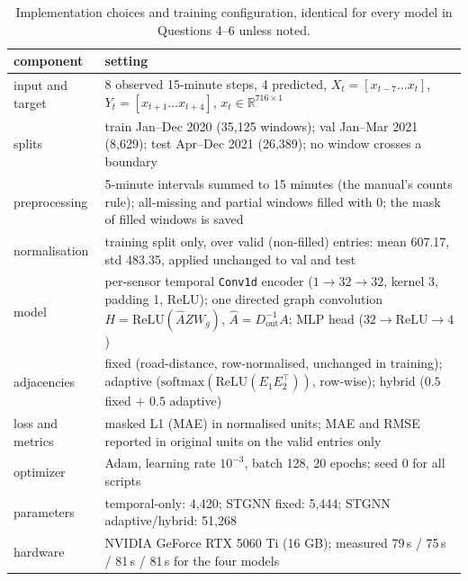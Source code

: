 \documentclass[11pt,letterpaper]{article}
\begin{document}
\begin{table}[htbp]
\centering
\small
\begin{tabular}{@{}p{1.2in}p{5.6in}@{}}
\toprule
\textbf{component} & \textbf{setting} \\
\midrule
input and target & 8 observed 15-minute steps, 4 predicted, $X_t = [x_{t-7} \dots x_t]$, $Y_t = [x_{t+1} \dots x_{t+4}]$, $x_t \in \mathbb{R}^{716 \times 1}$ \\
splits & train Jan--Dec 2020 (35{,}125 windows); val Jan--Mar 2021 (8{,}629); test Apr--Dec 2021 (26{,}389); no window crosses a boundary \\
preprocessing & 5-minute intervals summed to 15 minutes (the manual's counts rule); all-missing and partial windows filled with $0$; the mask of filled windows is saved \\
normalisation & training split only, over valid (non-filled) entries: mean 607.17, std 483.35, applied unchanged to val and test \\
model & per-sensor temporal \texttt{Conv1d} encoder ($1 \!\to\! 32 \!\to\! 32$, kernel 3, padding 1, ReLU); one directed graph convolution $H = \mathrm{ReLU}(\hat{A} Z W_g)$, $\hat{A} = D_{\mathrm{out}}^{-1} A$; MLP head ($32 \to \mathrm{ReLU} \to 4$) \\
adjacencies & fixed (road-distance, row-normalised, unchanged in training); adaptive ($\mathrm{softmax}(\mathrm{ReLU}(E_1 E_2^{\top}))$, row-wise); hybrid ($0.5$ fixed $+$ $0.5$ adaptive) \\
loss and metrics & masked L1 (MAE) in normalised units; MAE and RMSE reported in original units on the valid entries only \\
optimizer & Adam, learning rate $10^{-3}$, batch 128, 20 epochs; seed 0 for all scripts \\
parameters & temporal-only: 4{,}420; STGNN fixed: 5{,}444; STGNN adaptive/hybrid: 51{,}268 \\
hardware & NVIDIA GeForce RTX 5060 Ti (16 GB); measured 79\,s / 75\,s / 81\,s / 81\,s for the four models \\
\bottomrule
\end{tabular}
\caption{Implementation choices and training configuration, identical for every model in
Questions 4--6 unless noted.}
\label{tab:config}
\end{table}
\end{document}
